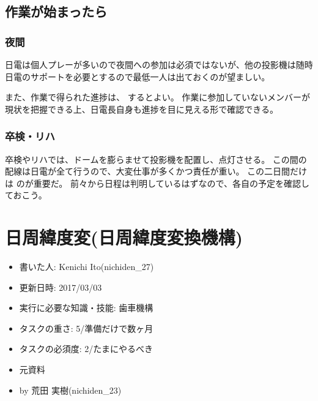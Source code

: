 \documentclass[letterpaper,10pt,dvipdfmx]{sphinxmanual}
\begin{document}
\section{作業が始まったら}
\label{\detokenize{management:id8}}

\subsection{夜間}
\label{\detokenize{management:id9}}
日電は個人プレーが多いので夜間への参加は必須ではないが、他の投影機は随時日電のサポートを必要とするので最低一人は出ておくのが望ましい。

また、作業で得られた進捗は、
するとよい。
作業に参加していないメンバーが現状を把握できる上、日電長自身も進捗を目に見える形で確認できる。


\subsection{卒検・リハ}
\label{\detokenize{management:id10}}
卒検やリハでは、ドームを膨らませて投影機を配置し、点灯させる。
この間の配線は日電が全て行うので、大変仕事が多くかつ責任が重い。
この二日間だけは  のが重要だ。
前々から日程は判明しているはずなので、各自の予定を確認しておこう。


\chapter{日周緯度変(日周緯度変換機構)}
\label{\detokenize{nissyu-idohen/kikou::doc}}\label{\detokenize{nissyu-idohen/kikou:id1}}\begin{itemize}
\item {} 
書いた人: Kenichi Ito(nichiden\_27)

\item {} 
更新日時: 2017/03/03

\item {} 
実行に必要な知識・技能: 歯車機構

\item {} 
タスクの重さ: 5/準備だけで数ヶ月

\item {} 
タスクの必須度: 2/たまにやるべき

\item {} 
元資料

\item {} 
 by 荒田 実樹(nichiden\_23)

\end{itemize}
\end{document}
